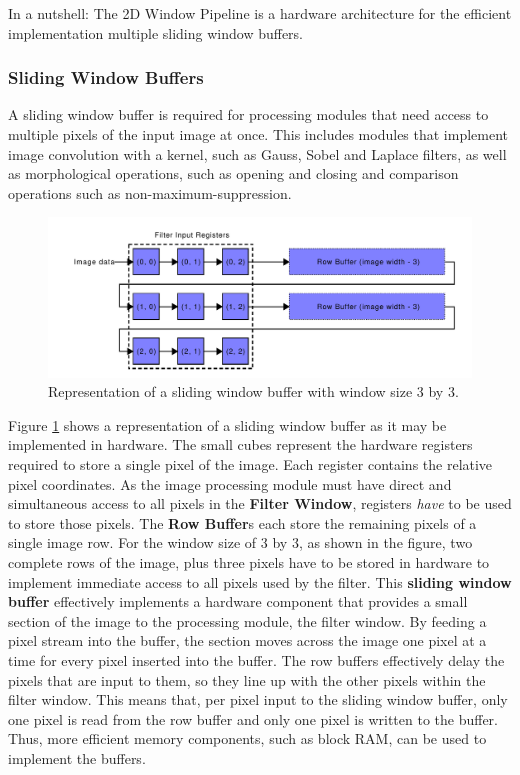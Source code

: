 In a nutshell: The 2D Window Pipeline is a hardware architecture for the efficient implementation multiple sliding window buffers.

\subsubsection{Sliding Window Buffers}

A sliding window buffer is required for processing modules that need access to multiple pixels of the input image at once.
This includes modules that implement image convolution with a kernel, such as Gauss, Sobel and Laplace filters, as well as morphological operations, such as opening and closing and comparison operations such as non-maximum-suppression.

\begin{figure}[htb]
\centering
\includegraphics[width=\textwidth]{figs/02-window_buffers_visual.pdf}
\caption{Representation of a sliding window buffer with window size 3 by 3.}
\label{fig:02-sliding_window_buffer}
\end{figure}

Figure \ref{fig:02-sliding_window_buffer} shows a representation of a sliding window buffer as it may be implemented in hardware.
The small cubes represent the hardware registers required to store a single pixel of the image.
Each register contains the relative pixel coordinates.
As the image processing module must have direct and simultaneous access to all pixels in the \textbf{Filter Window}, registers \textit{have} to be used to store those pixels.
The \textbf{Row Buffer}s each store the remaining pixels of a single image row.
For the window size of 3 by 3, as shown in the figure, two complete rows of the image, plus three pixels have to be stored in hardware to implement immediate access to all pixels used by the filter.
This \textbf{sliding window buffer} effectively implements a hardware component that provides a small section of the image to the processing module, the filter window.
By feeding a pixel stream into the buffer, the section moves across the image one pixel at a time for every pixel inserted into the buffer.
The row buffers effectively delay the pixels that are input to them, so they line up with the other pixels within the filter window.
This means that, per pixel input to the sliding window buffer, only one pixel is read from the row buffer  and only one pixel is written to the buffer.
Thus, more efficient memory components, such as block RAM, can be used to implement the buffers.

